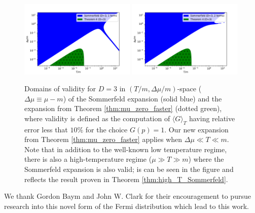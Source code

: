 \documentclass[sn-mathphys,Numbered]{sn-jnl}
\begin{document}
\begin{figure}
\centering
\includegraphics[width=0.49\textwidth]{./plot/Sommerfeld_vs_ours_regions_D3_1_term.pdf}
\includegraphics[width=0.49\textwidth]{./plot/Sommerfeld_vs_ours_regions_D3_2_terms.pdf}
\caption{Domains of validity for $D=3$ in $(T/m,\Delta\mu/m)$-space ($\Delta\mu\equiv\mu-m$) of the Sommerfeld expansion (solid blue) and the expansion from Theorem \ref{thm:mu_zero_faster} (dotted green), where validity is defined as the computation of $\langle G\rangle_T$ having relative error  less that $10\%$ for the choice  $G(p)=1$.  Our new expansion from Theorem \ref{thm:mu_zero_faster} applies when $\Delta\mu\ll T\ll m$.  Note that in addition to the well-known low temperature regime, there is also a high-temperature regime ($\mu\gg T\gg m$) where the Sommerfeld expansion is also valid; is can be seen in the figure and reflects the result  proven in Theorem \ref{thm:high_T_Sommerfeld}. }\label{fig:Thm3_vs_Sommerfeld_regions_terms_comp}
\end{figure}




\backmatter

We thank Gordon Baym and John W. Clark for their encouragement to pursue research into this novel form of the Fermi distribution which lead to this work.


\end{document}
